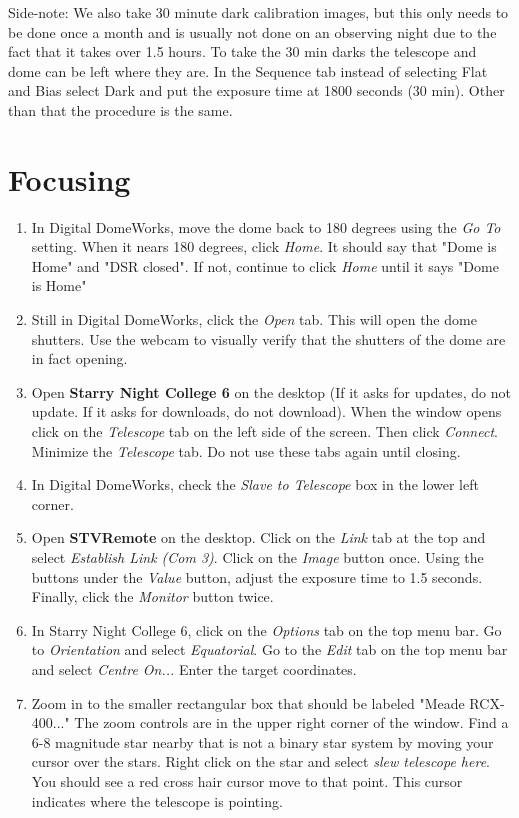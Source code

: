 \documentclass[11pt]{report}
\begin{document}
Side-note: We also take 30 minute dark calibration images, but this only needs to be done once a month and is usually not done on an observing night due to the fact that it takes over 1.5 hours. To take the 30 min darks the telescope and dome can be left where they are. In the Sequence tab instead of selecting Flat and Bias select Dark and put the exposure time at 1800 seconds (30 min). Other than that the procedure is the same. 

\section{Focusing}

\begin{enumerate}
\item In Digital DomeWorks, move the dome back to 180 degrees using the \emph{Go To} setting. When it nears 180 degrees, click \emph{Home}. It should say that "Dome is Home" and "DSR closed". If not, continue to click \emph{Home} until it says "Dome is Home"
\item Still in Digital DomeWorks, click the \emph{Open} tab. This will open the dome shutters. Use the webcam to visually verify that the shutters of the dome are in fact opening. 
\item Open {\bf Starry Night College 6} on the desktop (If it asks for updates, do not update. If it asks for downloads, do not download). When the window opens click on the \emph{Telescope} tab on the left side of the screen. Then click \emph{Connect}. Minimize the \emph{Telescope} tab. Do not use these tabs again until closing.
\item In Digital DomeWorks, check the \emph{Slave to Telescope} box in the lower left corner. 
\item Open {\bf STVRemote} on the desktop. Click on the \emph{Link} tab at the top and select \emph{Establish Link (Com 3)}. Click on the \emph{Image} button once. Using the buttons under the \emph{Value} button, adjust the exposure time to 1.5 seconds. Finally, click the \emph{Monitor} button twice. 
\item In Starry Night College 6, click on the \emph{Options} tab on the top menu bar. Go to \emph{Orientation} and select \emph{Equatorial}. Go to the \emph{Edit} tab on the top menu bar and select \emph{Centre On...} Enter the target coordinates. 
\item Zoom in to the smaller rectangular box that should be labeled "Meade RCX-400..." The zoom controls are in the upper right corner of the window. Find a 6-8 magnitude star nearby that is not a binary star system by moving your cursor over the stars. Right click on the star and select \emph{slew telescope here}. You should see a red cross hair cursor move to that point. This cursor indicates where the telescope is pointing. 

\end{enumerate}
\end{document}
